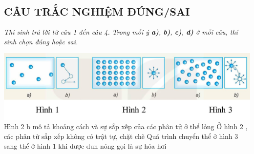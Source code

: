 \subsection{CÂU TRẮC NGHIỆM ĐÚNG/SAI}
\setcounter{ex}{0}
\textit{Thí sinh trả lời từ câu 1 đến câu 4. Trong mỗi ý \textbf{a)}, \textbf{b)}, \textbf{c)}, \textbf{d)} ở mỗi câu, thí sinh chọn đúng hoặc sai.}
\begin{ex}
	{\includegraphics[scale=0.4]{figs/G12Y24B7-4}}
	{Hình 2 b mô tả khoảng cách và sự sắp xếp của các phân tử ở thể lỏng}
	{Ở hình 2 , các phân tử sắp xếp không có trật tự, chặt chẽ}
	{\True Quá trình chuyển thể ở hình 3 sang thể ở hình 1 khi được đun nóng gọi là sự hóa hơi}
	\loigiai{}
\end{ex}
